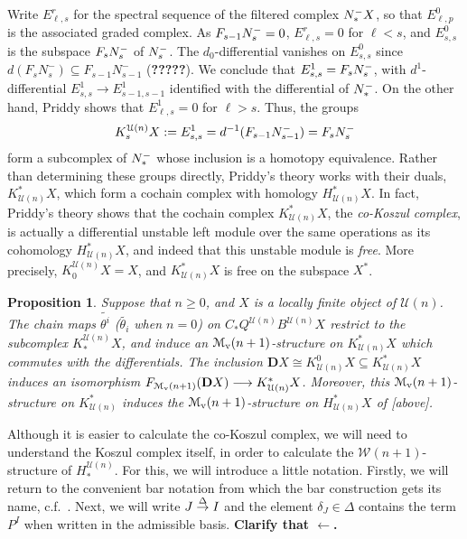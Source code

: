 \documentclass[11pt]{amsart}
\theoremstyle{plain}
\newtheorem{prop}[thm]{Proposition}
\theoremstyle{definition}
\renewcommand{\to}{\longrightarrow}
\newcommand{\calU}{\mathcal{U}}
\newcommand{\calw}{\mathcal{W}}
\newcommand{\calMv}{\mathcal{M}_\textup{v}}
\theoremstyle{plain}
\newcommand{\deltaalg}{\Delta} %
\newcommand{\produces}[3]{#3:#1\sim #2}
\renewcommand{\produces}[3]{#1\rightarrow_{#3} #2}%
\renewcommand{\produces}[3]{#1\overset{\smash{#3}}{\rightarrow} #2}%
\newcommand{\Nop}{N^{\smash{-}}}
\newcommand{\dual}{\mathbf{D}}
\begin{document}
\begin{Koszul complexes}
Write $E^r_{\ell,s}$ for the spectral sequence of the filtered complex $\Nop_*X$, so that $E^0_{\ell,p}$ is the associated graded complex. As $F_{s-1} \Nop_s=0$, $E^r_{\ell,s}=0$ for $\ell<s$, and $E^0_{s,s}$ is the subspace $F_s\Nop_s$ of $\Nop_s$. The $d_0$-differential vanishes on $E^0_{s,s}$ since $d(F_sN_s^-)\subseteq F_{s-1}N_{s-1}^-$ (\textbf{?????}). We conclude that $E^1_{s,s}=F_s\Nop_s$, with $d^1$-differential $E^1_{s,s}\to E^1_{s-1,s-1}$ identified with the differential of $\Nop_*$. On the other hand, Priddy shows that $E^1_{\ell,s}=0$  for $\ell>s$. Thus, the groups
\[K_s^{\calU(n)}X:=E^1_{s,s}=d^{-1}(F_{s-1}\Nop_{s-1})=F_s\Nop_s\]
form a subcomplex of $\Nop_*$ whose inclusion is a homotopy equivalence. Rather than determining these groups directly, Priddy's theory works with their duals, $K^*_{\calU(n)}X$, which form a cochain complex with homology $H^*_{\calU(n)}X$. In fact, Priddy's theory shows that the cochain complex $K^*_{\calU(n)}X$, the \emph{co-Koszul complex}, is actually a differential unstable left module over the same operations as its cohomology $H^*_{\calU(n)}X$, and indeed that this unstable module is \emph{free}. More precisely,  $K_0^{\calU(n)}X= X$, and $K^*_{\calU(n)}X$ is free on the  subspace $X^*$.
\begin{prop}\label{the cokoszul complex is free}
Suppose that $n\geq0$, and $X$ is a locally finite object of $\calU(n)$. The chain maps $\widetilde{\theta^i}$ ($\widetilde{\theta_i}$ when $n=0$) on $C_*Q^{\calU(n)}B^{\calU(n)}X$ restrict to the subcomplex $K_*^{\calU(n)}X$, and induce an $\calMv(n+1)$-structure on $K^*_{\calU(n)}X$ which commutes with the differentials. The inclusion $\dual X\cong K^0_{\calU(n)}X\subseteq K^*_{\calU(n)}X$ induces an isomorphism $F_{\calMv(n+1)}(\dual X)\to K^*_{\calU(n)}X$. Moreover, this $\calMv(n+1)$-structure on $K^*_{\calU(n)}$ induces the $\calMv(n+1)$-structure on $H^*_{\calU(n)}X$ of [above]. 
\end{prop}


Although it is easier to calculate the co-Koszul complex, we will need to understand the Koszul complex itself, in order to calculate the $\calw(n+1)$-structure of $H_*^{\calU(n)}$. For this, we will introduce a little notation. Firstly, we will return to the convenient bar notation from which the bar construction gets its name, c.f.\ \cite{PriddyKoszul.pdf}. Next, we will write $\produces{J}{I}{\deltaalg}$  and the element $\delta_J\in\deltaalg$ contains the term $P^I$ when written in the admissible basis. \textbf{Clarify that $\leftarrow$.}


\end{Koszul complexes}
\end{document}
